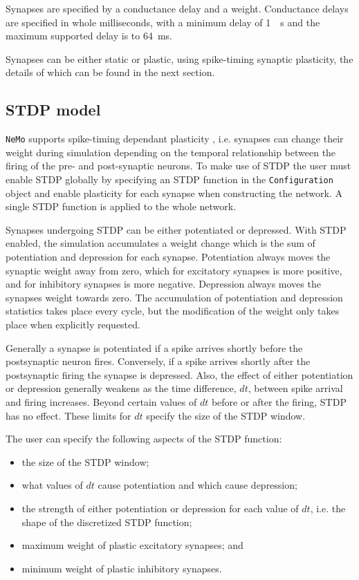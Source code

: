 \documentclass[a4paper]{article}
\newcommand{\nemo}{\texttt{NeMo}\xspace}
\newcommand{\code}[1]{\texttt{#1}}
\begin{document}

Synapses are specified by a conductance delay and a weight. Conductance delays
are specified in whole milliseconds, with a minimum delay of \SI{1}{\milli
\second} and the maximum supported delay is to \SI{64}{\milli \second}.

Synapses can be either static or plastic, using spike-timing synaptic
plasticity, the details of which can be found in the next section.

\subsection{STDP model}
\label{sec:stdp}

\nemo supports spike-timing dependant plasticity \cite{Sjostrom2010}, i.e.
synapses can change their weight during simulation depending on the temporal
relationship between the firing of the pre- and post-synaptic neurons. To make
use of STDP the user must enable STDP globally by specifying an STDP function
in the \code{Configuration} object and enable plasticity for each synapse when
constructing the network. A single STDP function is applied to the whole
network.

Synapses undergoing STDP can be either potentiated or depressed. With STDP
enabled, the simulation accumulates a weight change which is the sum of
potentiation and depression for each synapse. Potentiation always moves the
synaptic weight away from zero, which for excitatory synapses is more positive,
and for inhibitory synapses is more negative. Depression always moves the
synapses weight towards zero. The accumulation of potentiation and depression
statistics takes place every cycle, but the modification of the weight only
takes place when explicitly requested.

Generally a synapse is potentiated if a spike arrives shortly before the
postsynaptic neuron fires. Conversely, if a spike arrives shortly after the
postsynaptic firing the synapse is depressed. Also, the effect of either
potentiation or depression generally weakens as the time difference, $dt$,
between spike arrival and firing increases. Beyond certain values of $dt$
before or after the firing, STDP has no effect. These limits for $dt$ specify
the size of the STDP window.

The user can specify the following aspects of the STDP function:

\begin{itemize}
	\item the size of the STDP window;
	\item what values of $dt$ cause potentiation and which cause depression;
	\item the strength of either potentiation or depression for each value of $dt$, 
		i.e. the shape of the discretized STDP function;
	\item maximum weight of plastic excitatory synapses; and
	\item minimum weight of plastic inhibitory synapses.
\end{itemize}
\end{document}

